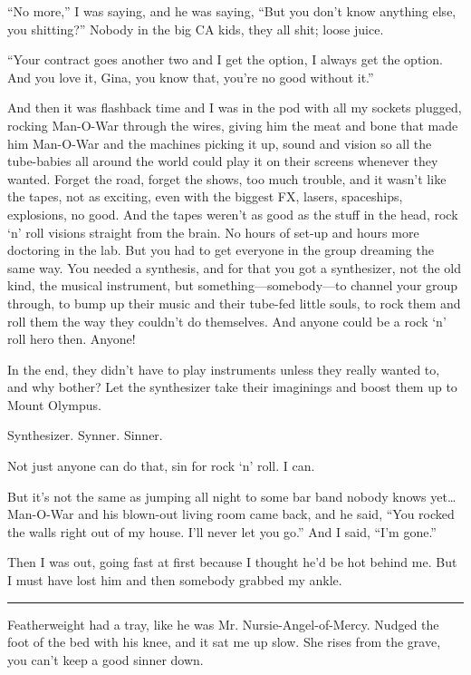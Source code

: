 ``No more,'' I was saying, and he was saying, ``But you don't know anything else, you shitting?'' Nobody in the big CA kids, they all shit; loose juice.

``Your contract goes another two and I get the option, I always get the option. And you love it, Gina, you know that, you're no good without it.''

And then it was flashback time and I was in the pod with all my sockets plugged, rocking Man-O-War through the wires, giving him the meat and bone that made him Man-O-War and the machines picking it up, sound and vision so all the tube-babies all around the world could play it on their screens whenever they wanted. Forget the road, forget the shows, too much trouble, and it wasn't like the tapes, not as exciting, even with the biggest FX, lasers, spaceships, explosions, no good. And the tapes weren't as good as the stuff in the head, rock `n' roll visions straight from the brain. No hours of set-up and hours more doctoring in the lab. But you had to get everyone in the group dreaming the same way. You needed a synthesis, and for that you got a synthesizer, not the old kind, the musical instrument, but something—somebody—to channel your group through, to bump up their music and their tube-fed little souls, to rock them and roll them the way they couldn't do themselves. And anyone could be a rock `n' roll hero then. Anyone!

In the end, they didn't have to play instruments unless they really wanted to, and why bother? Let the synthesizer take their imaginings and boost them up to Mount Olympus.

Synthesizer. Synner. Sinner.

Not just anyone can do that, sin for rock `n' roll. I can.

But it's not the same as jumping all night to some bar band nobody knows yet\ldots Man-O-War and his blown-out living room came back, and he said, ``You rocked the walls right out of my house. I'll never let you go.''
And I said, ``I'm gone.''

Then I was out, going fast at first because I thought he'd be hot behind me. But I must have lost him and then somebody grabbed my ankle.

\fancybreak{* * *}

Featherweight had a tray, like he was Mr. Nursie-Angel-of-Mercy. Nudged the foot of the bed with his knee, and it sat me up slow. She rises from the grave, you can't keep a good sinner down.

